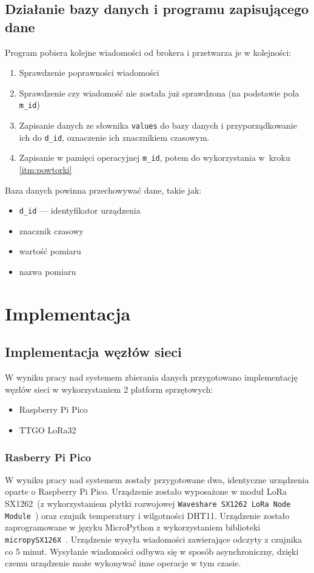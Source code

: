 \subsection{Działanie bazy danych i programu zapisującego dane}
Program pobiera kolejne wiadomości od brokera i przetwarza je w kolejności:
\begin{enumerate}
    \item Sprawdzenie poprawności wiadomości
    \item \label{itm:powtorki} Sprawdzenie czy wiadomość nie została już sprawdzona (na podstawie pola \texttt{m\_id})
    \item Zapisanie danych ze słownika \texttt{values} do bazy danych i przyporządkowanie ich do \texttt{d\_id}, oznaczenie ich znacznikiem czasowym.
    \item Zapisanie w pamięci operacyjnej \texttt{m\_id}, potem do wykorzystania w~kroku \ref{itm:powtorki}
\end{enumerate}
Baza danych powinna przechowywać dane, takie jak:
\begin{itemize}
    \item \texttt{d\_id} — identyfikator urządzenia
    \item znacznik czasowy
    \item wartość pomiaru
    \item nazwa pomiaru
\end{itemize}

\section{Implementacja}

\subsection{Implementacja węzłów sieci}
W wyniku pracy nad systemem zbierania danych przygotowano implementację węzłów sieci w wykorzystaniem 2 platform sprzętowych:
\begin{itemize}
    \item Raspberry Pi Pico
    \item TTGO LoRa32
\end{itemize}

\subsubsection{Rasberry Pi Pico}
W wyniku pracy nad systemem zostały przygotowane dwa, identyczne urządzenia oparte o Raspberry Pi Pico. Urządzenie zostało wyposażone w moduł LoRa SX1262~\cite{PICO:sx1262-doc}(z wykorzystaniem płytki rozwojowej \texttt{Waveshare SX1262 LoRa Node Module}~\cite{PICO:waveshare-doc}) oraz czujnik temperatury i wilgotności DHT11. Urządzenie zostało zaprogramowane w języku MicroPython z wykorzystaniem biblioteki \texttt{micropySX126X}~\cite{PICO:lora-lib}. Urządzenie wysyła wiadomości zawierające odczyty z czujnika co 5 minut. Wysyłanie wiadomości odbywa się w sposób asynchroniczny, dzięki czemu urządzenie może wykonywać inne operacje w tym czasie.

